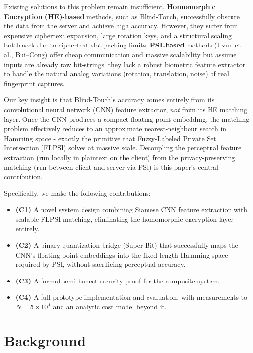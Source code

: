 \documentclass[11pt,a4paper]{article}
\begin{document}
Existing solutions to this problem remain insufficient. \textbf{Homomorphic Encryption (HE)-based} methods, such as Blind-Touch, successfully obscure the data from the server and achieve high accuracy. However, they suffer from expensive ciphertext expansion, large rotation keys, and a structural scaling bottleneck due to ciphertext slot-packing limits. \textbf{PSI-based} methods (Uzun et al., Bui--Cong) offer cheap communication and massive scalability but assume inputs are already raw bit-strings; they lack a robust biometric feature extractor to handle the natural analog variations (rotation, translation, noise) of real fingerprint captures.

Our key insight is that Blind-Touch's accuracy comes entirely from its convolutional neural network (CNN) feature extractor, \emph{not} from its HE matching layer. Once the CNN produces a compact floating-point embedding, the matching problem effectively reduces to an approximate nearest-neighbour search in Hamming space - exactly the primitive that Fuzzy-Labeled Private Set Intersection (FLPSI) solves at massive scale. Decoupling the perceptual feature extraction (run locally in plaintext on the client) from the privacy-preserving matching (run between client and server via PSI) is this paper's central contribution.

Specifically, we make the following contributions:
\begin{itemize}[noitemsep]
  \item \textbf{(C1)} A novel system design combining Siamese CNN feature extraction with scalable FLPSI matching, eliminating the homomorphic encryption layer entirely.
  \item \textbf{(C2)} A binary quantization bridge (Super-Bit) that successfully maps the CNN's floating-point embeddings into the fixed-length Hamming space required by PSI, without sacrificing perceptual accuracy.
  \item \textbf{(C3)} A formal semi-honest security proof for the composite system.
  \item \textbf{(C4)} A full prototype implementation and evaluation, with measurements to $N=5\times10^4$ and an analytic cost model beyond it.
\end{itemize}

\section{Background}
\end{document}

